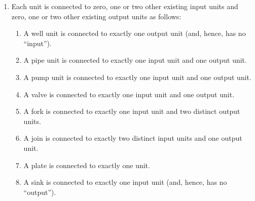 \HHHH\LLLL

\begin{enumerate}\setei
\item \label{p-e-11}   Each unit is connected to zero, one or two
                       other existing input units and  zero, one or two
                       other existing output units as follows:
\begin{enumerate}
\item \label{p-e-04}   A well unit is connected to exactly one output
                       unit (and, hence, has no ``input'').
\item \label{p-e-05}   A pipe unit is connected to exactly one input unit
                       and one output unit.
\item \label{p-e-06}   A pump unit is connected to exactly one input unit
                       and one output unit.
\item \label{p-e-07}   A valve is connected to exactly one input unit
                       and one output unit.
\item \label{p-e-08}   A fork is connected to exactly one input unit
                       and two distinct output units.
\item \label{p-e-09}   A join is connected to exactly two distinct input units
                       and one output unit.
\item \label{p-e-85}   A plate is connected to exactly one unit.
\item \label{p-e-10}   A sink is connected to exactly one input unit
                       (and, hence, has no ``output''). 
\end{enumerate}
\savei\end{enumerate}

\mnewfoil\LLLL

